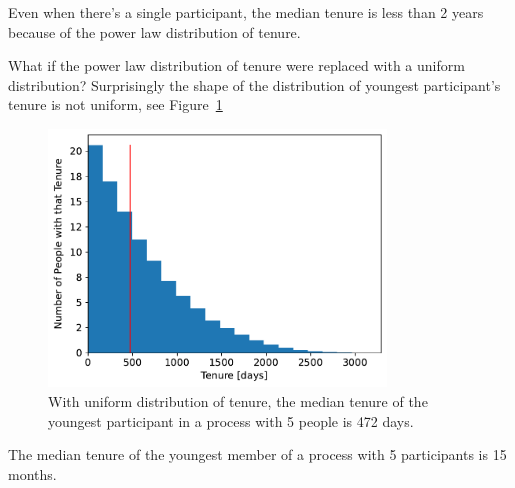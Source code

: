 Even when there's a single participant, the median tenure is less than 2 years because of the power law distribution of tenure.

What if the power law distribution of tenure were replaced with a uniform distribution?
Surprisingly the shape of the distribution of youngest participant's tenure is not uniform, see Figure~\ref{fig:tenure-uniform-5-participants}

\begin{figure}[H]
    \centering
    \includegraphics[width=0.8\textwidth]{images/tenure_uniform_distribution_with_max_tenure10_and_5_participants_median472.pdf}
    \caption{With uniform distribution of tenure,
the median tenure of the youngest participant
 in a process with 5 people is 472 days.}
    \label{fig:tenure-uniform-5-participants}
\end{figure}

The median tenure of the youngest member of a process with 5 participants is 15 months. 
